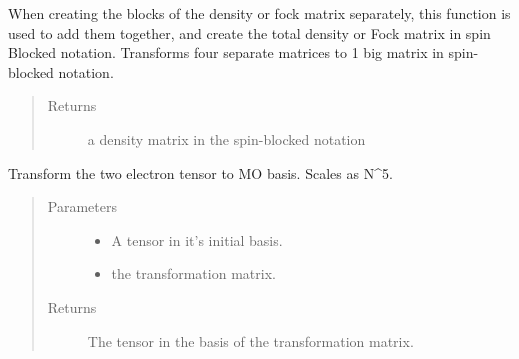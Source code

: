 \documentclass[letterpaper,10pt,english]{sphinxmanual}
\begin{document}

\begin{fulllineitems}
\label{\detokenize{transform:hf.utilities.transform.spin_blocked}}
When creating the blocks of the density or fock matrix separately, this function is used to add them together,
and create the total density or Fock matrix in spin Blocked notation. Transforms four separate matrices to 1 big
matrix in spin-blocked notation.
\begin{quote}\begin{description}
\item[{Returns}] \leavevmode
a density matrix in the spin-blocked notation

\end{description}\end{quote}

\end{fulllineitems}


\begin{fulllineitems}
\label{\detokenize{transform:hf.utilities.transform.tensor_basis_transform}}
Transform the two electron tensor to MO basis. Scales as N\textasciicircum{}5.
\begin{quote}\begin{description}
\item[{Parameters}] \leavevmode\begin{itemize}
\item {} 
 \textendash{} A tensor in it’s initial basis.

\item {} 
 \textendash{} the transformation matrix.

\end{itemize}

\item[{Returns}] \leavevmode
The tensor in the basis of the transformation matrix.

\end{description}\end{quote}

\end{fulllineitems}
\end{document}
